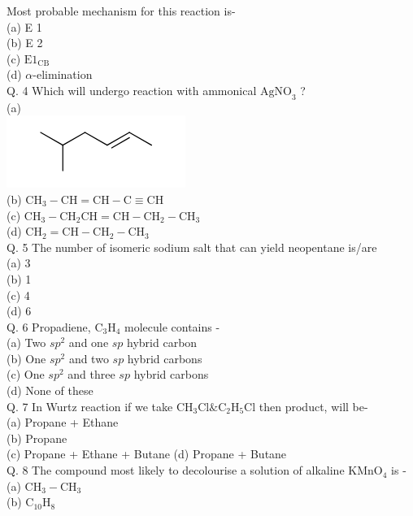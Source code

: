 \documentclass[10pt]{article}
\begin{document}
Most probable mechanism for this reaction is-\\
(a) E 1\\
(b) E 2\\
(c) $\mathrm{E} 1_{\mathrm{CB}}$\\
(d) $\alpha$-elimination\\
Q. 4 Which will undergo reaction with ammonical $\mathrm{AgNO}_{3}$ ?\\
(a)\\
\includegraphics{smile-288c746bc4943f5c0466eb66898091b9999b39f8}\\
(b) $\mathrm{CH}_{3}-\mathrm{CH}=\mathrm{CH}-\mathrm{C} \equiv \mathrm{CH}$\\
(c) $\mathrm{CH}_{3}-\mathrm{CH}_{2} \mathrm{CH}=\mathrm{CH}-\mathrm{CH}_{2}-\mathrm{CH}_{3}$\\
(d) $\mathrm{CH}_{2}=\mathrm{CH}-\mathrm{CH}_{2}-\mathrm{CH}_{3}$\\
Q. 5 The number of isomeric sodium salt that can yield neopentane is/are\\
(a) 3\\
(b) 1\\
(c) 4\\
(d) 6\\
Q. 6 Propadiene, $\mathrm{C}_{3} \mathrm{H}_{4}$ molecule contains -\\
(a) Two $s p^{2}$ and one $s p$ hybrid carbon\\
(b) One $s p^{2}$ and two $s p$ hybrid carbons\\
(c) One $s p^{2}$ and three $s p$ hybrid carbons\\
(d) None of these\\
Q. 7 In Wurtz reaction if we take $\mathrm{CH}_{3} \mathrm{Cl} \& \mathrm{C}_{2} \mathrm{H}_{5} \mathrm{Cl}$ then product, will be-\\
(a) Propane + Ethane\\
(b) Propane\\
(c) Propane + Ethane + Butane (d) Propane + Butane\\
Q. 8 The compound most likely to decolourise a solution of alkaline $\mathrm{KMnO}_{4}$ is -\\
(a) $\mathrm{CH}_{3}-\mathrm{CH}_{3}$\\
(b) $\mathrm{C}_{10} \mathrm{H}_{8}$\\
\end{document}
